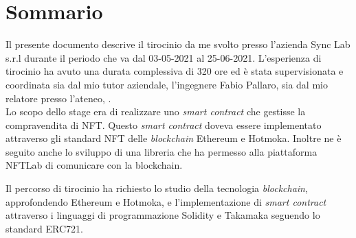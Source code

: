 
\cleardoublepage
{}
{}
\begingroup
\let\clearpage\relax
\let\cleardoublepage\relax
\let\cleardoublepage\relax

\chapter*{Sommario}

Il presente documento descrive il tirocinio da me svolto presso l'azienda Sync Lab s.r.l durante il periodo che va dal 03-05-2021 al 25-06-2021.
L'esperienza di tirocinio ha avuto una durata complessiva di 320 ore ed è stata supervisionata e coordinata sia dal mio tutor aziendale, l'ingegnere Fabio Pallaro, sia dal mio relatore presso l'ateneo, \profTitle{} \myProf. \\

\noindent Lo scopo dello stage era di realizzare uno \emph{smart contract} che gestisse la compravendita di NFT. Questo \emph{smart contract} doveva essere implementato attraverso gli standard NFT delle \emph{blockchain} Ethereum e Hotmoka. Inoltre ne è seguito anche lo sviluppo di una libreria che ha permesso alla piattaforma NFTLab di comunicare con la blockchain.

\noindent Il percorso di tirocinio ha richiesto lo studio della tecnologia \emph{blockchain}, approfondendo Ethereum e Hotmoka, e l'implementazione di \emph{smart contract} attraverso i linguaggi di programmazione Solidity e Takamaka seguendo lo standard ERC721. \\

